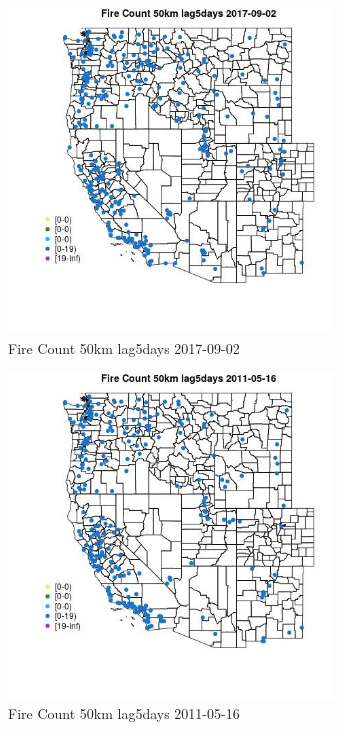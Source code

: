 \begin{figure} 
\centering  
\includegraphics[width=0.77\textwidth]{Code_Outputs/Report_ML_input_PM25_Step4_part_e_de_duplicated_aves_compiled_2019-05-20wNAs_MapObsFire_Count_50km_lag5days2017-09-02.jpg} 
\caption{\label{fig:Report_ML_input_PM25_Step4_part_e_de_duplicated_aves_compiled_2019-05-20wNAsMapObsFire_Count_50km_lag5days2017-09-02}Fire Count 50km lag5days 2017-09-02} 
\end{figure} 
 

\begin{figure} 
\centering  
\includegraphics[width=0.77\textwidth]{Code_Outputs/Report_ML_input_PM25_Step4_part_e_de_duplicated_aves_compiled_2019-05-20wNAs_MapObsFire_Count_50km_lag5days2011-05-16.jpg} 
\caption{\label{fig:Report_ML_input_PM25_Step4_part_e_de_duplicated_aves_compiled_2019-05-20wNAsMapObsFire_Count_50km_lag5days2011-05-16}Fire Count 50km lag5days 2011-05-16} 
\end{figure} 
 

